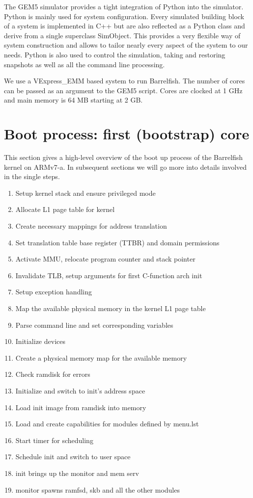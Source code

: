 \documentclass[a4paper,twoside]{report} %
\begin{document}
The GEM5 simulator provides a tight integration of Python into the
simulator. Python is mainly used for system configuration. Every
simulated building block of a system is implemented in C++ but are
also reflected as a Python class and derive from a single superclass
SimObject. This provides a very flexible way of system construction
and allows to tailor nearly every aspect of the system to our needs.
Python is also used to control the simulation, taking and restoring
snapshots as well as all the command line processing.

We use a VExpress\_EMM based system to run Barrelfish. The number of
cores can be passed as an argument to the GEM5 script. Cores are
clocked at 1 GHz and main memory is 64 MB starting at 2 GB.

\section{Boot process: first (bootstrap) core}


This section gives a high-level overview of the boot up process of the
Barrelfish
kernel on ARMv7-a. In subsequent sections we will go more into details
involved
in the single steps.
\begin{enumerate}
\item Setup kernel stack and ensure privileged mode
\item Allocate L1 page table for kernel
\item Create necessary mappings for address translation
\item Set translation table base register (TTBR) and domain
  permissions
\item Activate MMU, relocate program counter and stack pointer
\item Invalidate TLB, setup arguments for first C-function arch init
\item Setup exception handling
\item Map the available physical memory in the kernel L1 page table
\item Parse command line and set corresponding variables
\item Initialize devices
\item Create a physical memory map for the available memory
\item Check ramdisk for errors
\item Initialize and switch to init’s address space
\item Load init image from ramdisk into memory
\item Load and create capabilities for modules defined by menu.lst
\item Start timer for scheduling
\item Schedule init and switch to user space
\item init brings up the monitor and mem serv
\item monitor spawns ramfsd, skb and all the other modules
\end{enumerate}
\end{document}
